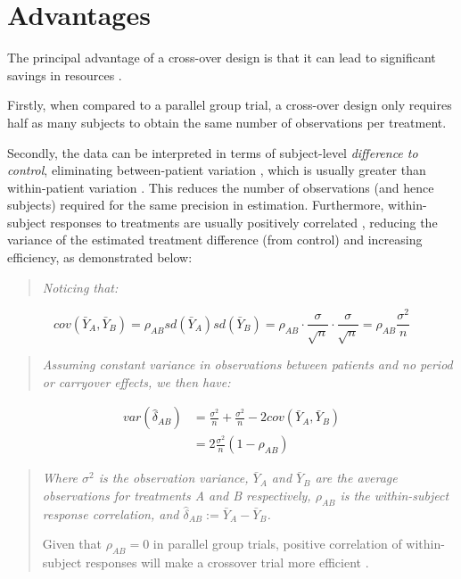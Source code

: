 \documentclass[12pt, TexShade, letterpaper]{report}
\begin{document}
\section{Advantages}
The principal advantage of a cross-over design is that it can lead to significant savings in resources \cite{senn2002crossover}.

Firstly, when compared to a parallel group trial, a cross-over design only requires half as many subjects to obtain the same number of observations per treatment. 

Secondly, the data can be interpreted in terms of subject-level \textit{difference to control}, eliminating between-patient variation \cite{senn2002crossover}, which is usually greater than within-patient variation \cite{piantadosi2005clinical}. This reduces the number of observations (and hence subjects) required for the same precision in estimation. Furthermore, within-subject responses to treatments are usually positively correlated \cite{piantadosi2005clinical}, reducing the variance of the estimated treatment difference (from control) and increasing efficiency, as demonstrated below:

\begin{quote}
    \textit{Noticing that:}
\end{quote}
\begin{equation*}
    cov(\bar{Y}_A, \bar{Y}_B)
= \rho_{AB}sd(\bar{Y}_A)sd(\bar{Y}_B) = \rho_{AB} \cdot \frac{\sigma}{\sqrt{n}} \cdot \frac{\sigma}{\sqrt{n}} = \rho_{AB}\frac{\sigma^2}{n}
\end{equation*}
\begin{quote}
    \textit{Assuming constant variance in observations between patients and no period or carryover effects, we then have:}
\end{quote}
\begin{align*}
    var(\hat{\delta}_{AB}) &=
    \frac{\sigma^2}{n} + \frac{\sigma^2}{n} - 2cov(\bar{Y}_A, \bar{Y}_B) \\
    &= 2\frac{\sigma^2}{n}(1-\rho_{AB})
\end{align*}
\begin{quote}
    \textit{Where $\sigma^2$ is the observation variance, $\bar{Y}_A$ and $\bar{Y}_B$ are the average observations for treatments A and B respectively, $\rho_{AB}$ is the within-subject response correlation, and $\hat{\delta}_{AB} := \bar{Y}_A - \bar{Y}_B$.}

    Given that $\rho_{AB} = 0$ in parallel group trials, positive correlation of within-subject responses will make a crossover trial more efficient \cite{piantadosi2005clinical}.
\end{quote}
\end{document}
